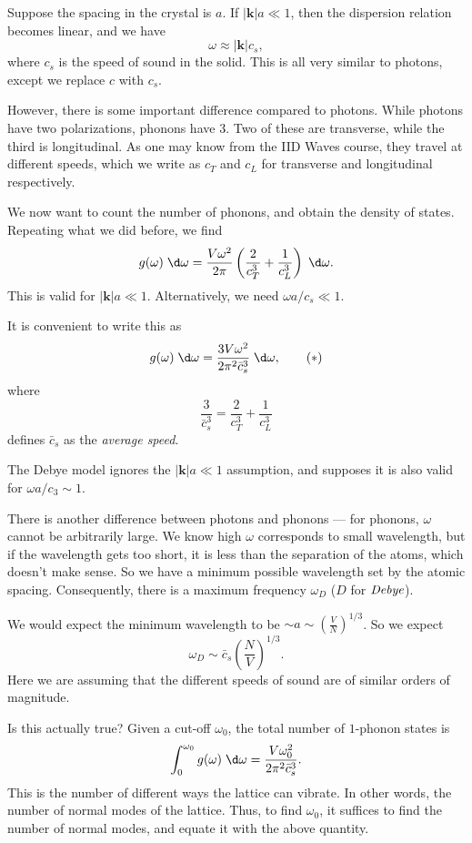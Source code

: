 \documentclass[a4paper]{article}
\begin{document}
Suppose the spacing in the crystal is $a$. If $|\mathbf{k}| a \ll 1$, then the dispersion relation becomes linear, and we have
\[
  \omega \approx |\mathbf{k}| c_s,
\]
where $c_s$ is the speed of sound in the solid. This is all very similar to photons, except we replace $c$ with $c_s$.

However, there is some important difference compared to photons. While photons have two polarizations, phonons have 3. Two of these are transverse, while the third is longitudinal. As one may know from the IID Waves course, they travel at different speeds, which we write as $c_T$ and $c_L$ for transverse and longitudinal respectively.

We now want to count the number of phonons, and obtain the density of states. Repeating what we did before, we find
\[
  g(\omega) \;\d \omega = \frac{V \omega^2}{2\pi} \left(\frac{2}{c_T^3} + \frac{1}{c_L^3}\right)\;\d \omega.
\]
This is valid for $|\mathbf{k}| a \ll 1$. Alternatively, we need $\omega a/ c_s \ll 1$.

It is convenient to write this as
\[
  g(\omega) \;\d \omega = \frac{3 V \omega^2}{2\pi^2 \bar{c}_s^3}\;\d \omega,\tag{$*$}
\]
where
\[
  \frac{3}{\bar{c}_s^3} = \frac{2}{c_T^3} + \frac{1}{c_L^3}
\]
defines $\bar{c}_s$ as the \emph{average speed}.

The Debye model ignores the $|\mathbf{k}|a \ll 1$ assumption, and supposes it is also valid for $\omega a/c_3 \sim 1$.

There is another difference between photons and phonons --- for phonons, $\omega$ cannot be arbitrarily large. We know high $\omega$ corresponds to small wavelength, but if the wavelength gets too short, it is less than the separation of the atoms, which doesn't make sense. So we have a minimum possible wavelength set by the atomic spacing. Consequently, there is a maximum frequency $\omega_D$ ($D$ for $\emph{Debye}$).

We would expect the minimum wavelength to be $\sim a \sim \left(\frac{V}{N}\right)^{1/3}$. So we expect
\[
  \omega_D \sim \bar{c}_s \left(\frac{N}{V}\right)^{1/3}.
\]
Here we are assuming that the different speeds of sound are of similar orders of magnitude.

Is this actually true? Given a cut-off $\omega_0$, the total number of $1$-phonon states is
\[
  \int_0^{\omega_0} g(\omega) \;\d \omega = \frac{V \omega_0^2}{2\pi^2 \bar{c}_s^3}.
\]
This is the number of different ways the lattice can vibrate. In other words, the number of normal modes of the lattice. Thus, to find $\omega_0$, it suffices to find the number of normal modes, and equate it with the above quantity.
\end{document}
